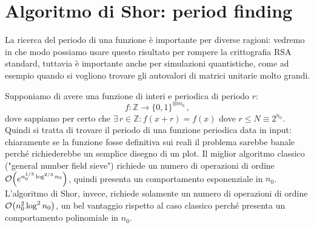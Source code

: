 \section{Algoritmo di Shor: period finding}
La ricerca del periodo di una funzione è importante per diverse ragioni: vedremo in che modo possiamo usare questo risultato per rompere la crittografia RSA standard, tuttavia è importante anche per simulazioni quantistiche, come ad esempio quando si vogliono trovare gli autovalori di matrici unitarie molto grandi. 

\noindent Supponiamo di avere una funzione di interi e periodica di periodo $r$:
\begin{equation*}
    f:\mathbb{Z}\rightarrow\{0,1\}^{\otimes m_0} \, ,
\end{equation*}
dove sappiamo per certo che $\exists \, r \in \mathbb{Z} : f(x+r)=f(x)$ dove $r \leqslant N \equiv 2^{n_0}$. Quindi si tratta di trovare il periodo di una funzione periodica data in input: chiaramente se la funzione fosse definitiva sui reali il problema sarebbe banale perché richiederebbe un semplice disegno di un plot. Il miglior algoritmo classico ("general number field sieve") richiede un numero di operazioni di ordine $\order{e^{n_0^{1/3} \log^{2/3}n_0}}$, quindi presenta un comportamento esponenziale in $n_0$. L'algoritmo di Shor, invece, richiede solamente un numero di operazioni di ordine $\order{n_0^2\log^2n_0}$, un bel vantaggio rispetto al caso classico perché presenta un comportamento polinomiale in $n_0$. 

